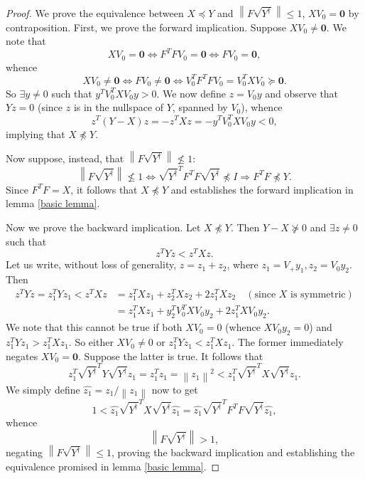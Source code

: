 \documentclass[11pt]{article}
\newcommand{\norm}[1]{\left\|#1\right\|}
\newcommand{\Leq}{\preceq}
\newcommand{\Geq}{\succeq}
\begin{document}
\begin{proof}
We prove the equivalence between $X \Leq Y$ and $\norm{F \sqrt{Y^{\dagger}} } \leq 1$, $X V_0 = \mathbf{0}$ by contraposition. First, we prove the forward implication. Suppose $X V_0 \neq \mathbf{0}$. We note that 
\[ XV_0 = \mathbf{0} \Leftrightarrow F^T F V_0 = \mathbf{0} \Leftrightarrow FV_0 = \mathbf{0}, \]
whence
\[ XV_0 \neq \mathbf{0} \Leftrightarrow FV_0 \neq \mathbf{0} \Leftrightarrow V_0 ^T F^T F V_0 = V_0 ^T X V_0 \Geq \mathbf{0}. \]
So $\exists y \neq 0$ such that $y^T V_0 ^T X V_0 y > 0$. We now define $z = V_0 y$ and observe that $Y z = 0$ (since $z$ is in the nullspace of $Y$, spanned by $V_0$), whence
\[ z^T (Y - X) z = - z^T X z = - y^T V_0 ^T X V_0 y  < 0, \]
implying that $X \not \Leq Y$.

\noindent Now suppose, instead, that $\norm{F \sqrt{Y^{\dagger}}} \not \leq 1$:
\[ \norm{F \sqrt{Y^{\dagger}} } \not \leq 1 \Leftrightarrow \sqrt{Y^{\dagger}} ^T F^T F \sqrt{Y^{\dagger}} \not \Leq I  \Rightarrow F^T F \not \Leq Y. \]
Since $F^T F = X$, it follows that $X \not \Leq Y$ and establishes the forward implication in lemma \ref{basic lemma}.

\noindent Now we prove the backward implication. Let $X \not \Leq Y$. Then $Y - X \not \Geq 0$ and $\exists z \neq 0$ such that
\[ z^T Y z < z^T X z. \]
Let us write, without loss of generality, $z = z_1 + z_2$, where $z_1 = V_+ y_1, z_2 = V_0 y_2$. Then 
\begin{align*}
z^T Y z = z_1 ^T Y z_1 < z^T X z &= z_1 ^T X z_1 + z_2 ^T X z_2 + 2 z_1 ^T X z_2 \quad (\text{since }X \text{ is symmetric})\\
&= z_1 ^T X z_1 + y_2 ^T V_0 ^T X V_0 y_2 + 2 z_1 ^T X V_0 y_2.
\end{align*}
We note that this cannot be true if both $XV_0 = 0$ (whence $X V_0 y_2 = 0$) and $z_1 ^T Y z_1 > z_1 ^T X z_1$. So either $XV_0 \neq 0$ or $z_1 ^T Y z_1 < z_1 ^T X z_1$. The former immediately negates $XV_0 = \mathbf{0}$. Suppose the latter is true. It follows that
\[ z_1 ^T \sqrt{Y^{\dagger}}^T Y \sqrt{Y^{\dagger}} z_1 = z_1 ^T z_1 = \norm{z_1}^2 < z_1 ^T \sqrt{Y^{\dagger}}^T X \sqrt{Y^{\dagger}} z_1. \]
We simply define $\hat{z_1} = z_1 / \norm{z_1}$ now to get 
\[ 1 < \hat{z_1} \sqrt{Y^{\dagger}}^T X \sqrt{Y^{\dagger}} \hat{z_1} = \hat{z_1} \sqrt{Y^{\dagger}}^T F^T F \sqrt{Y^{\dagger}} \hat{z_1}, \]
whence
\[ \norm{F \sqrt{Y^{\dagger}}} > 1,\]
negating $\norm{F \sqrt{Y^{\dagger}}} \leq 1$, proving the backward implication and establishing the equivalence promised in lemma \ref{basic lemma}.
\end{proof}
\end{document}
